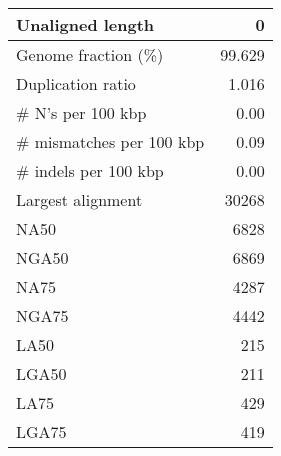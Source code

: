 \documentclass[12pt,a4paper]{article}
\begin{document}
\begin{table}[ht]
\begin{center}
\begin{tabular}{|l*{1}{|r}|}
Unaligned length & 0 \\ \hline
Genome fraction (\%) & 99.629 \\ \hline
Duplication ratio & 1.016 \\ \hline
\# N's per 100 kbp & 0.00 \\ \hline
\# mismatches per 100 kbp & 0.09 \\ \hline
\# indels per 100 kbp & 0.00 \\ \hline
Largest alignment & 30268 \\ \hline
NA50 & 6828 \\ \hline
NGA50 & 6869 \\ \hline
NA75 & 4287 \\ \hline
NGA75 & 4442 \\ \hline
LA50 & 215 \\ \hline
LGA50 & 211 \\ \hline
LA75 & 429 \\ \hline
LGA75 & 419 \\ \hline
\end{tabular}
\end{center}
\end{table}
\end{document}
